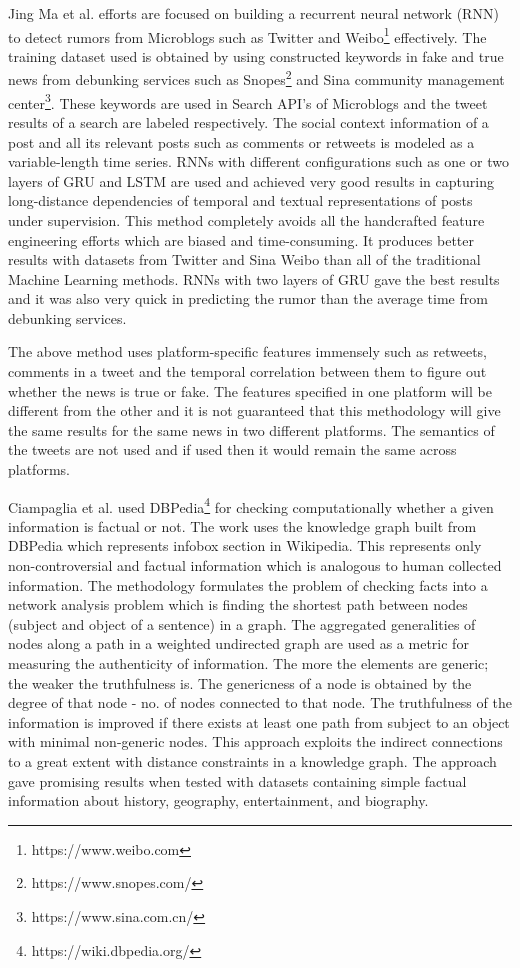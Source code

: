 \documentclass[a4paper, 11pt]{article}
\begin{document}
Jing Ma et al.\cite{Ma} efforts are focused on building a recurrent neural network (RNN) to detect rumors from Microblogs such as Twitter and Weibo\footnote{https://www.weibo.com} effectively. The training dataset used is obtained by using constructed keywords in fake and true news from debunking services such as Snopes\footnote{https://www.snopes.com/} and Sina community management center\footnote{https://www.sina.com.cn/}. These keywords are used in Search API's of Microblogs and the tweet results of a search are labeled respectively. The social context information of a post and all its relevant posts such as comments or retweets is modeled as a variable-length time series. RNNs with different configurations such as one or two layers of GRU and LSTM are used and achieved very good results in capturing long-distance dependencies of temporal and textual representations of posts under supervision. This method completely avoids all the handcrafted feature engineering efforts which are biased and time-consuming. It produces better results with datasets from Twitter and Sina Weibo than all of the traditional Machine Learning methods. RNNs with two layers of GRU gave the best results and it was also very quick in predicting the rumor than the average time from debunking services.

The above method uses platform-specific features immensely such as retweets, comments in a tweet and the temporal correlation between them to figure out whether the news is true or fake. The features specified in one platform will be different from the other and it is not guaranteed that this methodology will give the same results for the same news in two different platforms. The semantics of the tweets are not used and if used then it would remain the same across platforms. 

Ciampaglia et al. \cite{Ciampaglia2015} used DBPedia\footnote{https://wiki.dbpedia.org/} for checking computationally whether a given information is factual or not. The work uses the knowledge graph built from DBPedia which represents infobox section in Wikipedia. This represents only non-controversial and factual information which is analogous to human collected information. The methodology formulates the problem of checking facts into a network analysis problem which is finding the shortest path between nodes (subject and object of a sentence) in a graph. The aggregated generalities of nodes along a path in a weighted undirected graph are used as a metric for measuring the authenticity of information. The more the elements are generic; the weaker the truthfulness is.  The genericness of a node is obtained by the degree of that node - no. of nodes connected to that node. The truthfulness of the information is improved if there exists at least one path from subject to an object with minimal non-generic nodes. This approach exploits the indirect connections to a great extent with distance constraints in a knowledge graph. The approach gave promising results when tested with datasets containing simple factual information about history, geography, entertainment, and biography. 
\end{document}
